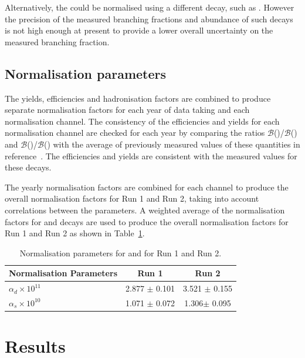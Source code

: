{{Alternatively, the \bsmumu \BF could be normalised using a different \bs decay, such as \bsjpsiphi. However the precision of the measured branching fractions and abundance of such decays is not high enough at present to provide a lower overall uncertainty on the measured branching fraction.

\subsection{Normalisation parameters}
\label{normparams}
The yields, efficiencies and hadronisation factors are combined to produce separate normalisation factors for each year of data taking and each normalisation channel. The consistency of the efficiencies and yields for each normalisation channel are checked for each year by comparing the ratios $\mathcal{B}$(\bdkpi)/$\mathcal{B}$(\bujpsik) and $\mathcal{B}$(\bujpsik)/$\mathcal{B}$(\bsjpsiphi) with the average of previously measured values of these quantities in reference~\cite{Olive:2016xmw}. The efficiencies and yields are consistent with the measured values for these decays. 


The yearly normalisation factors are combined for each channel to produce the overall normalisation factors for Run 1 and Run 2, taking into account correlations between the parameters. A weighted average of the normalisation factors for \bdkpi and \bujpsik decays are used to produce the overall normalisation factors for Run 1 and Run 2 as shown in Table~\ref{tab:normparams}.

\begin{table}[tb]
\begin{center}
\begin{tabular}{lcc}
\toprule \toprule
Normalisation Parameters & Run 1 & Run 2 \\ \midrule
$\alpha_{d} \times 10^{11}$ & 2.877 $\pm$ 0.101 & 3.521 $\pm$ 0.155 \\ %
$\alpha_{s} \times 10^{10}$ & 1.071 $\pm$ 0.072 & 1.306$ \pm$ 0.095 \\
\bottomrule \bottomrule
\end{tabular}
\vspace{0.7cm}
\caption{Normalisation parameters for \bsmumu and \bdmumu for Run 1 and Run 2.}
\label{tab:normparams}
\end{center}
\vspace{-1.0cm}
\end{table}


\section{Results}
\label{sec:BFResults}

}}
